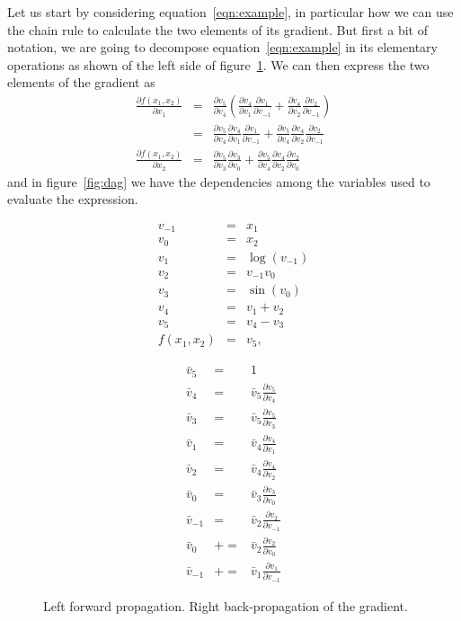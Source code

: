 \documentclass{article}
\newcommand{\partialfrac}[2]{\frac{\partial #1}{\partial #2}}
\newcommand{\pluseq}{\mathrel{{+}{=}}}
\begin{document}
Let us start by considering equation~\ref{eqn:example}, in particular how we can
use the chain rule to calculate the two elements of its gradient. But first a
bit of notation, we are going to decompose equation~\ref{eqn:example} in its
elementary operations as shown of the left side of figure~\ref{fig:example}.
We can then express the two elements of the gradient as
\begin{eqnarray*}
\partialfrac{f(x_1,x_2)}{x_1}
&=& \partialfrac{v_5}{v_4}\left(\partialfrac{v_4}{v_1}\partialfrac{v_1}{v_{-1}}
	+ \partialfrac{v_4}{v_2}\partialfrac{v_2}{v_{-1}}\right) \\
&=& \partialfrac{v_5}{v_4}\partialfrac{v_4}{v_1}\partialfrac{v_1}{v_{-1}}
	+ \partialfrac{v_5}{v_4}\partialfrac{v_4}{v_2}\partialfrac{v_2}{v_{-1}} \\
\partialfrac{f(x_1,x_2)}{x_2}
&=& \partialfrac{v_5}{v_3}\partialfrac{v_3}{v_0}
	+ \partialfrac{v_5}{v_4}\partialfrac{v_4}{v_2}\partialfrac{v_2}{v_0}
\end{eqnarray*}
and in figure~\ref{fig:dag} we have the dependencies among the variables used
to evaluate the expression.

\begin{figure}
\begin{minipage}{.5\textwidth}
\begin{eqnarray*}
v_{-1} &=& x_1 \\
v_0 &=& x_2 \\
v_1 &=& \log(v_{-1}) \\
v_2 &=& v_{-1}v_0 \\
v_3 &=& \sin(v_0) \\
v_4 &=& v_1+v_2 \\
v_5 &=& v_4-v_3 \\
f(x_1,x_2) &=& v_5,
\end{eqnarray*}
\end{minipage}
\begin{minipage}{.5\textwidth}
\renewcommand{\partialfrac}[2]{\textstyle\frac{\partial#1}{\partial#2}}
\begin{eqnarray*}
\bar v_5 &=& 1 \\
\bar v_4 &=& \bar v_5 \partialfrac{v_5}{v_4} \\
\bar v_3 &=& \bar v_5 \partialfrac{v_5}{v_3} \\
\bar v_1 &=& \bar v_4 \partialfrac{v_4}{v_1} \\
\bar v_2 &=& \bar v_4 \partialfrac{v_4}{v_2} \\
\bar v_0 &=& \bar v_3 \partialfrac{v_3}{v_0} \\
\bar v_{-1} &=& \bar v_2 \partialfrac{v_2}{v_{-1}} \\
\bar v_0 &\pluseq& \bar v_2 \partialfrac{v_2}{v_0} \\
\bar v_{-1} &\pluseq& \bar v_1 \partialfrac{v_1}{v_{-1}}
\end{eqnarray*}
\end{minipage}
\label{fig:example}
\caption{Left forward propagation. Right back-propagation of the gradient.}
\end{figure}
\end{document}
